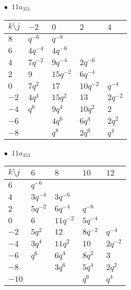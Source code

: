 \begin{minipage}{\linewidth}
$\bullet\ $ $11a_{351}$ \vspace{0.5em} \\
\begin{tabular}{l|llll}
$k \setminus j$ & $-2$ & $0$ & $2$ & $4$ \\
\hline
$8$ & $q^{-6}$ & $q^{-8}$ &  &  \\
$6$ & $4q^{-4}$ & $4q^{-6}$ &  &  \\
$4$ & $7q^{-2}$ & $9q^{-4}$ & $2q^{-6}$ &  \\
$2$ & $9$ & $15q^{-2}$ & $6q^{-4}$ &  \\
$0$ & $7q^{2}$ & $17$ & $10q^{-2}$ & $q^{-4}$ \\
$-2$ & $4q^{4}$ & $15q^{2}$ & $13$ & $2q^{-2}$ \\
$-4$ & $q^{6}$ & $9q^{4}$ & $10q^{2}$ & $2$ \\
$-6$ &  & $4q^{6}$ & $6q^{4}$ & $2q^{2}$ \\
$-8$ &  & $q^{8}$ & $2q^{6}$ & $q^{4}$ \\
\end{tabular}
\vspace{2em}
\end{minipage}
%
\begin{minipage}{\linewidth}
$\bullet\ $ $11a_{353}$ \vspace{0.5em} \\
\begin{tabular}{l|llll}
$k \setminus j$ & $6$ & $8$ & $10$ & $12$ \\
\hline
$6$ & $q^{-6}$ &  &  &  \\
$4$ & $3q^{-4}$ & $3q^{-6}$ &  &  \\
$2$ & $5q^{-2}$ & $6q^{-4}$ & $q^{-6}$ &  \\
$0$ & $6$ & $11q^{-2}$ & $5q^{-4}$ &  \\
$-2$ & $5q^{2}$ & $12$ & $8q^{-2}$ & $q^{-4}$ \\
$-4$ & $3q^{4}$ & $11q^{2}$ & $10$ & $2q^{-2}$ \\
$-6$ & $q^{6}$ & $6q^{4}$ & $8q^{2}$ & $3$ \\
$-8$ &  & $3q^{6}$ & $5q^{4}$ & $2q^{2}$ \\
$-10$ &  &  & $q^{6}$ & $q^{4}$ \\
\end{tabular}
\vspace{2em}
\end{minipage}
%
